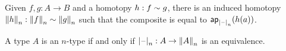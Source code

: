 \documentclass[hott-all.tex]{subfiles}
\begin{document}
% 
% 
\begin{lem}
  Given $f,g:A\to B$ and a homotopy $h:f\htpy g$, there is an induced homotopy $\trunc n h : \trunc n f \htpy \trunc n g$ such that the composite
  is equal to $\apfunc{\tprojf n}(h(a))$.
\end{lem}
% 
% 
\begin{cor}
  A type $A$ is an $n$-type if and only if $\tprojf n : A \to \trunc n A$ is an equivalence.
\end{cor}
\end{document}
